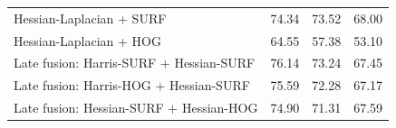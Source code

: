 \documentclass[12pt, a4paper]{article}
\begin{document}
\begin{table}[H]
\begin{tabular}{lrrr}
          Hessian-Laplacian + SURF & 74.34 & 73.52 & 68.00 \\                                                                                                                      
          Hessian-Laplacian + HOG  & 64.55 & 57.38 & 53.10 \\                                                                                                                      
          Late fusion: Harris-SURF + Hessian-SURF & 76.14 & 73.24 & 67.45 \\                                                                                                       
          Late fusion: Harris-HOG + Hessian-SURF  & 75.59 & 72.28 & 67.17 \\                                                                                                       
          Late fusion: Hessian-SURF + Hessian-HOG & 74.90 & 71.31 & 67.59 \\                                                                                                       
          \hline                                                                                                                                                                   
      \end{tabular}                                                                                                                                                                
  \end{table}
\end{document}
